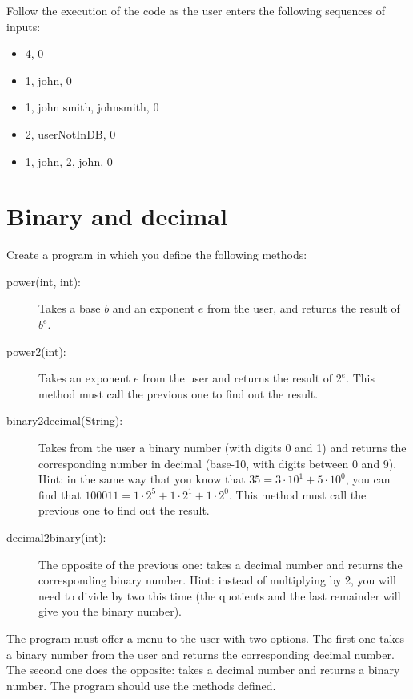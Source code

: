 \documentclass{article}
\begin{document}
Follow the execution of the code as the user enters the following
sequences of inputs:

\begin{itemize}
\item 4, 0
\item 1, john, 0
\item 1, john smith, johnsmith, 0
\item 2, userNotInDB, 0
\item 1, john, 2, john, 0
\end{itemize}



\section{Binary and decimal}
\label{sec:from-10011-19}

Create a program in which you define the following methods: 

\begin{description}
\item[power(int, int): ] Takes a base $b$ and an
  exponent $e$ from the user, and returns the result of $b^e$.
\item[power2(int): ] Takes an exponent $e$ from the user and returns the
  result of $2^e$. This method must call the previous one to find out
  the result. 
\item[binary2decimal(String):] Takes from the user a binary number
  (with digits 0 and 1) and returns the corresponding number in
  decimal (base-10, with digits between 0 and 9).  Hint: in the same
  way that you know that $35 = 3 \cdot 10^1 + 5 \cdot 10^0$, you can find that
  $100011 = 1 \cdot 2^5 + 1 \cdot 2^1 + 1 \cdot 2^0$. This method must
  call the previous one to find out the result. 
\item[decimal2binary(int):] The opposite of the previous one: takes a
  decimal number and returns the corresponding binary number.  Hint:
  instead of multiplying by 2, you will need to divide by two this
  time (the quotients and the last remainder will give you the binary
  number).
\end{description}

The program must offer a menu to the user with two options. 
The first one takes a binary number from the
user and returns the corresponding decimal number. The second one does
the opposite: takes a decimal number and returns a binary number. The
program should use the methods defined. 
\end{document}
